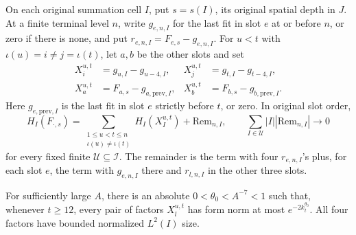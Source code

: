 \begin{lemma}
\label{lem:hbase-X-output}
On each original summation cell \(I\), put \(s=s(I)\), its original
spatial depth in \(J\).  At a finite terminal level \(n\), write \(g_{e,n,I}\) for the last
fit in slot \(e\) at or before \(n\), or zero if there is none, and
put \(r_{e,n,I}=F_{e,s}-g_{e,n,I}\).  For \(u<t\) with
\(\iota(u)=i\ne j=\iota(t)\), let \(a,b\) be the other slots and set
\begin{equation}
 \begin{aligned}
 X_i^{u,t}&=g_{u,I}-g_{u-4,I},&
 X_j^{u,t}&=g_{t,I}-g_{t-4,I},\\
 X_a^{u,t}&=F_{a,s}-g_{a,\mathrm{prev},I},&
 X_b^{u,t}&=F_{b,s}-g_{b,\mathrm{prev},I}.
 \end{aligned}                                                   \label{eq:hbase-X}
\end{equation}
Here \(g_{e,\mathrm{prev},I}\) is the last fit in slot \(e\) strictly
before \(t\), or zero.  In original slot order,
\begin{equation}
 H_I(F_{\cdot,s})
  =\sum_{\substack{1\le u<t\le n\\\iota(u)\ne\iota(t)}}
       H_I(X^{u,t}_I)+\mathrm{Rem}_{n,I},\qquad
 \sum_{I\in\mathcal U}|I||\mathrm{Rem}_{n,I}|\longrightarrow0     \label{eq:hbase-X-remainder}
\end{equation}
for every fixed finite \(\mathcal U\subseteq\mathcal I\).
The remainder is the term with four \(r_{e,n,I}\)'s plus, for each
slot \(e\), the term with \(g_{e,n,I}\) there and \(r_{l,n,I}\) in
the other three slots.

For sufficiently large \(A\), there is an absolute
\(0<\theta_0<A^{-7}<1\) such that, whenever \(t\ge12\), every pair
of factors \(X_l^{u,t}\) has form norm at most
\(e^{-2k_t^{\theta_0}}\).  All four factors have bounded normalized
\(L^2(I)\) size.
\end{lemma}

